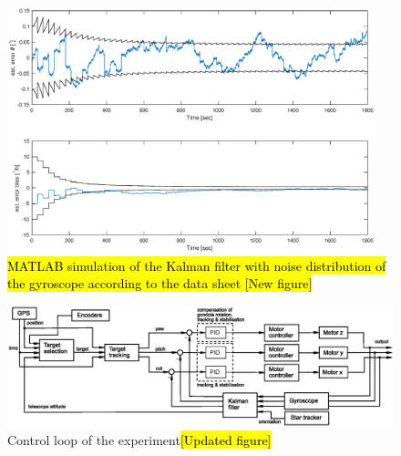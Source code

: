 \begin{figure}%
	\centering
	\includegraphics[width = 0.95\textwidth]{4-experiment-design/img/software/kalman_filter.eps}
	\caption{\hl{MATLAB simulation of the Kalman filter with noise distribution of the gyroscope according to the data sheet [New figure]}}
	\label{fig::software::Kalman_filter}
\end{figure}

\newpage
\begin{landscape}
	\begin{figure}
		\includegraphics[width=\linewidth]{4-experiment-design/img/software/Control_loop.eps}
		\caption{Control loop of the experiment\hl{[Updated figure]}}
		\label{fig::software::control_loop}
	\end{figure}
\end{landscape}


\raggedbottom
